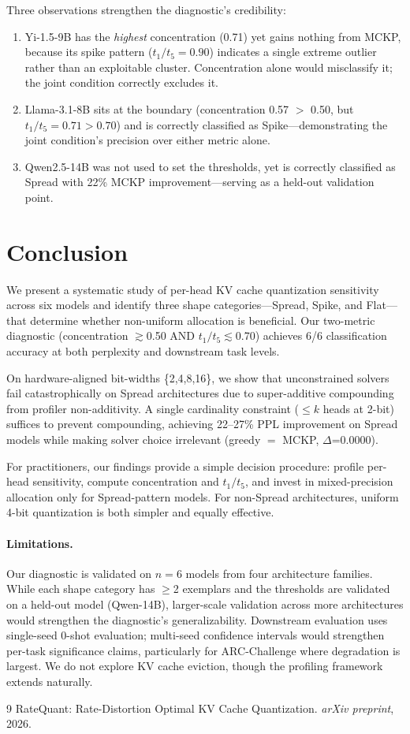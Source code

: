 \documentclass[11pt,a4paper]{article}
\newcommand{\ttf}{t_1/t_5}
\begin{document}
Three observations strengthen the diagnostic's credibility:
\begin{enumerate}
\item Yi-1.5-9B has the \emph{highest} concentration (0.71) yet gains nothing from MCKP, because its spike pattern ($\ttf = 0.90$) indicates a single extreme outlier rather than an exploitable cluster. Concentration alone would misclassify it; the joint condition correctly excludes it.
\item Llama-3.1-8B sits at the boundary (concentration 0.57 $>$ 0.50, but $\ttf = 0.71 > 0.70$) and is correctly classified as Spike---demonstrating the joint condition's precision over either metric alone.
\item Qwen2.5-14B was not used to set the thresholds, yet is correctly classified as Spread with 22\% MCKP improvement---serving as a held-out validation point.
\end{enumerate}

\section{Conclusion}

We present a systematic study of per-head KV cache quantization sensitivity across six models and identify three shape categories---Spread, Spike, and Flat---that determine whether non-uniform allocation is beneficial.
Our two-metric diagnostic (concentration $\gtrsim$0.50 AND $\ttf \lesssim$0.70) achieves 6/6 classification accuracy at both perplexity and downstream task levels.

On hardware-aligned bit-widths \{2,4,8,16\}, we show that unconstrained solvers fail catastrophically on Spread architectures due to super-additive compounding from profiler non-additivity.
A single cardinality constraint ($\leq k$ heads at 2-bit) suffices to prevent compounding, achieving 22--27\% PPL improvement on Spread models while making solver choice irrelevant (greedy $=$ MCKP, $\Delta$=0.0000).

For practitioners, our findings provide a simple decision procedure: profile per-head sensitivity, compute concentration and $\ttf$, and invest in mixed-precision allocation only for Spread-pattern models.
For non-Spread architectures, uniform 4-bit quantization is both simpler and equally effective.

\paragraph{Limitations.}
Our diagnostic is validated on $n{=}6$ models from four architecture families. While each shape category has $\geq$2 exemplars and the thresholds are validated on a held-out model (Qwen-14B), larger-scale validation across more architectures would strengthen the diagnostic's generalizability.
Downstream evaluation uses single-seed 0-shot evaluation; multi-seed confidence intervals would strengthen per-task significance claims, particularly for ARC-Challenge where degradation is largest.
We do not explore KV cache eviction, though the profiling framework extends naturally.

\begin{thebibliography}{9}
RateQuant: Rate-Distortion Optimal KV Cache Quantization.
\emph{arXiv preprint}, 2026.
\end{thebibliography}
\end{document}
